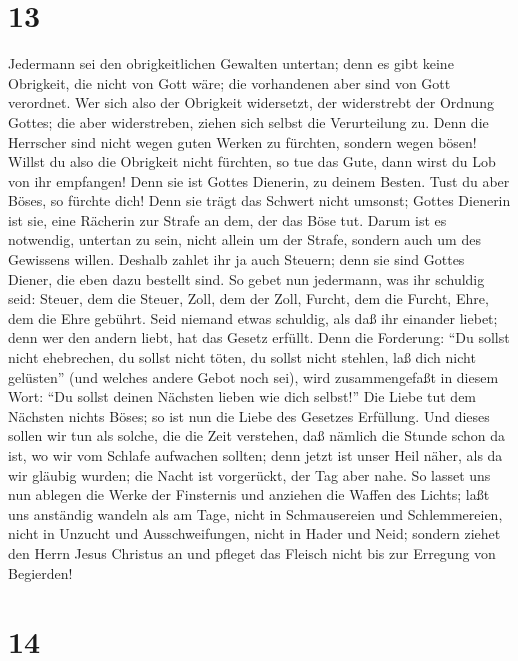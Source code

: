 \hypertarget{section-12}{%
\section{13}\label{section-12}}

 Jedermann sei den obrigkeitlichen Gewalten untertan; denn
es gibt keine Obrigkeit, die nicht von Gott wäre; die vorhandenen aber
sind von Gott verordnet.  Wer sich also der Obrigkeit
widersetzt, der widerstrebt der Ordnung Gottes; die aber widerstreben,
ziehen sich selbst die Verurteilung zu.  Denn die
Herrscher sind nicht wegen guten Werken zu fürchten, sondern wegen
bösen! Willst du also die Obrigkeit nicht fürchten, so tue das Gute,
dann wirst du Lob von ihr empfangen!  Denn sie ist Gottes
Dienerin, zu deinem Besten. Tust du aber Böses, so fürchte dich! Denn
sie trägt das Schwert nicht umsonst; Gottes Dienerin ist sie, eine
Rächerin zur Strafe an dem, der das Böse tut.  Darum ist
es notwendig, untertan zu sein, nicht allein um der Strafe, sondern auch
um des Gewissens willen.  Deshalb zahlet ihr ja auch
Steuern; denn sie sind Gottes Diener, die eben dazu bestellt sind.
 So gebet nun jedermann, was ihr schuldig seid: Steuer,
dem die Steuer, Zoll, dem der Zoll, Furcht, dem die Furcht, Ehre, dem
die Ehre gebührt.  Seid niemand etwas schuldig, als daß
ihr einander liebet; denn wer den andern liebt, hat das Gesetz erfüllt.
 Denn die Forderung: ``Du sollst nicht ehebrechen, du
sollst nicht töten, du sollst nicht stehlen, laß dich nicht gelüsten''
(und welches andere Gebot noch sei), wird zusammengefaßt in diesem Wort:
``Du sollst deinen Nächsten lieben wie dich selbst!'' 
Die Liebe tut dem Nächsten nichts Böses; so ist nun die Liebe des
Gesetzes Erfüllung.  Und dieses sollen wir tun als
solche, die die Zeit verstehen, daß nämlich die Stunde schon da ist, wo
wir vom Schlafe aufwachen sollten; denn jetzt ist unser Heil näher, als
da wir gläubig wurden;  die Nacht ist vorgerückt, der Tag
aber nahe. So lasset uns nun ablegen die Werke der Finsternis und
anziehen die Waffen des Lichts;  laßt uns anständig
wandeln als am Tage, nicht in Schmausereien und Schlemmereien, nicht in
Unzucht und Ausschweifungen, nicht in Hader und Neid; 
sondern ziehet den Herrn Jesus Christus an und pfleget das Fleisch nicht
bis zur Erregung von Begierden!

\hypertarget{section-13}{%
\section{14}\label{section-13}}

